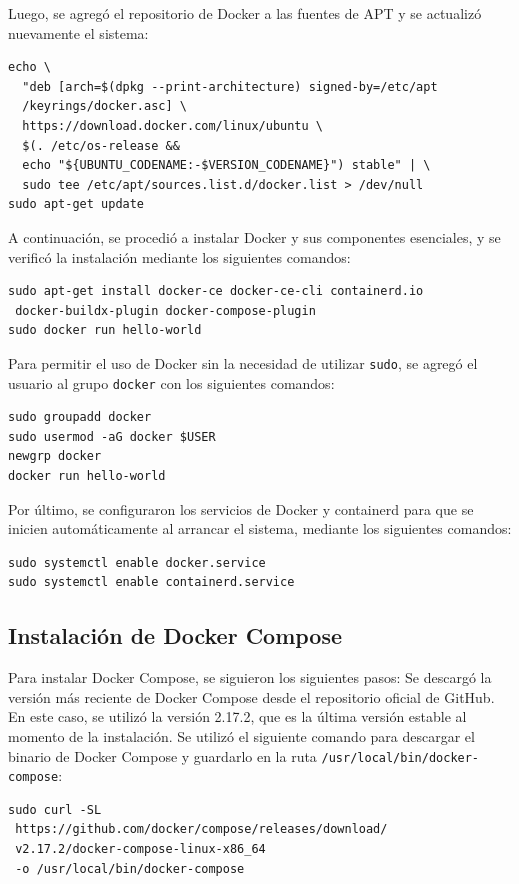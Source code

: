 Luego, se agregó el repositorio de Docker a las fuentes de APT y se actualizó
nuevamente el sistema:

\begin{verbatim}
echo \
  "deb [arch=$(dpkg --print-architecture) signed-by=/etc/apt
  /keyrings/docker.asc] \
  https://download.docker.com/linux/ubuntu \
  $(. /etc/os-release && 
  echo "${UBUNTU_CODENAME:-$VERSION_CODENAME}") stable" | \
  sudo tee /etc/apt/sources.list.d/docker.list > /dev/null
sudo apt-get update
\end{verbatim}

A continuación, se procedió a instalar Docker y sus componentes esenciales, y
se verificó la instalación mediante los siguientes comandos:

\begin{verbatim}
sudo apt-get install docker-ce docker-ce-cli containerd.io 
 docker-buildx-plugin docker-compose-plugin
sudo docker run hello-world
\end{verbatim}

Para permitir el uso de Docker sin la necesidad de utilizar \texttt{sudo}, se
agregó el usuario al grupo \texttt{docker} con los siguientes comandos:

\begin{verbatim}
sudo groupadd docker
sudo usermod -aG docker $USER
newgrp docker
docker run hello-world
\end{verbatim}

Por último, se configuraron los servicios de Docker y containerd para que se
inicien automáticamente al arrancar el sistema, mediante los siguientes
comandos:

\begin{verbatim}
sudo systemctl enable docker.service
sudo systemctl enable containerd.service
\end{verbatim}

\subsection{Instalación de Docker Compose}

Para instalar Docker Compose, se siguieron los siguientes pasos: Se descargó la
versión más reciente de Docker Compose desde el repositorio oficial de GitHub.
En este caso, se utilizó la versión 2.17.2, que es la última versión estable al
momento de la instalación. Se utilizó el siguiente comando para descargar el
binario de Docker Compose y guardarlo en la ruta
\texttt{/usr/local/bin/docker-compose}:
\begin{verbatim}
sudo curl -SL
 https://github.com/docker/compose/releases/download/
 v2.17.2/docker-compose-linux-x86_64 
 -o /usr/local/bin/docker-compose
\end{verbatim}

